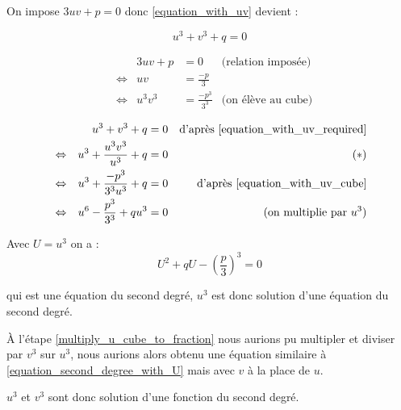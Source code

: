 \documentclass[]{../templates/homework}
\begin{document}
On impose $3uv + p = 0$ donc \eqref{equation_with_uv} devient :

\begin{equation*}
	u^3 + v^3 + q = 0 \tag{$E_3$} \label{equation_with_uv_required}
\end{equation*}

\question

\begin{align*}
	&& 3uv + p &= 0 &\text{(relation imposée)}\\
	&\Leftrightarrow &uv &= \frac{-p}{3} & \\
	&\Leftrightarrow &u^3v^3 &= \frac{-p^3}{3^3} &\text{(on élève au cube)} \tag{$E_4$} \label{equation_with_uv_cube}
\end{align*}

\question

\begin{align*}
	&& u^3 + v^3 + q &= 0 &\text{d'après \eqref{equation_with_uv_required}} \\
	&\Leftrightarrow &u^3 + \frac{u^3v^3}{u^3} + q &= 0 & \tag{$\ast$} \label{multiply_u_cube_to_fraction}\\
	&\Leftrightarrow &u^3 + \frac{-p^3}{3^3u^3} + q &= 0 &\text{d'après \eqref{equation_with_uv_cube}} \\
	&\Leftrightarrow &u^6 - \frac{p^3}{3^3} + qu^3 &= 0 &\text{(on multiplie par $u^3$)}
\end{align*}

Avec $U = u^3$ on a :
\begin{equation}
	\tag{$E_5$}
	U^2 + qU - \left(\frac{p}{3}\right)^3 = 0
	\label{equation_second_degree_with_U}
\end{equation}

qui est une équation du second degré, $u^3$ est donc solution d'une équation du second degré.

À l'étape \eqref{multiply_u_cube_to_fraction} nous aurions pu multipler et diviser par $v^3$ sur $u^3$, nous aurions alors obtenu une équation similaire à \eqref{equation_second_degree_with_U} mais avec $v$ à la place de $u$.

$u^3$ et $v^3$ sont donc solution d'une fonction du second degré.
\end{document}
